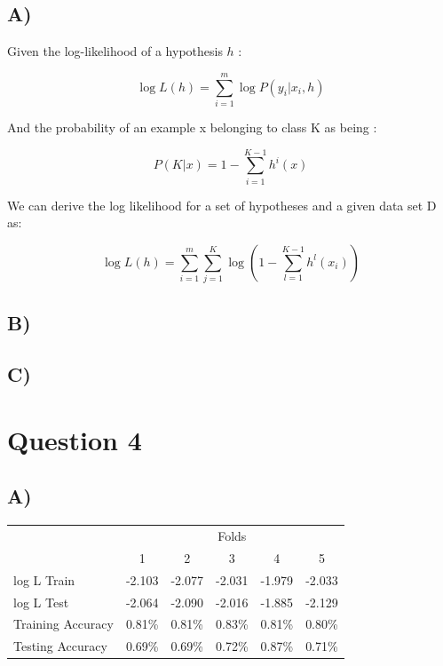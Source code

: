 \documentclass{report}
\begin{document}
\subsection*{A)}
Given the log-likelihood of a hypothesis $h$ :

\begin{equation}
  \log L(h) = \sum_{i=1}^{m} \log P(y_i|x_i,h)
\end{equation}

And the probability of an example x belonging to class K as being :

\begin{equation}
  P(K | x) = 1 - \sum_{i=1}^{K-1}h^i(x)
\end{equation}

We can derive the log likelihood for a set of hypotheses and a given data set D as:

\begin{equation}
  \log L(h) = \sum_{i=1}^{m} \sum_{j=1}^{K} \log \left( 1 - \sum_{l=1}^{K-1}h^l(x_i) \right)
\end{equation}


\subsection*{B)}
\subsection*{C)}

\section*{Question 4}
\subsection*{A)}
\begin{center}
\begin{table}[h]
 \begin{tabular}{l|c|c|c|c|c|}
 \cline{2-6}
     & \multicolumn{5}{c|}{Folds}      \\ \cline{2-6}
     &  1  &  2  &  3  &  4  &  5 \\ \hline
\multicolumn{1}{|l|}{log L Train} & -2.103 & -2.077 & -2.031 & -1.979 & -2.033  \\ \hline
\multicolumn{1}{|l|}{log L Test} & -2.064 & -2.090 & -2.016 & -1.885 & -2.129  \\ \hline
\multicolumn{1}{|l|}{Training Accuracy} & 0.81\% & 0.81\% & 0.83\% & 0.81\% & 0.80\% \\ \hline
\multicolumn{1}{|l|}{Testing Accuracy} & 0.69\% & 0.69\% & 0.72\% & 0.87\% & 0.71\% \\ \hline
\end{tabular}
\end{table}
\end{center}
\end{document}
